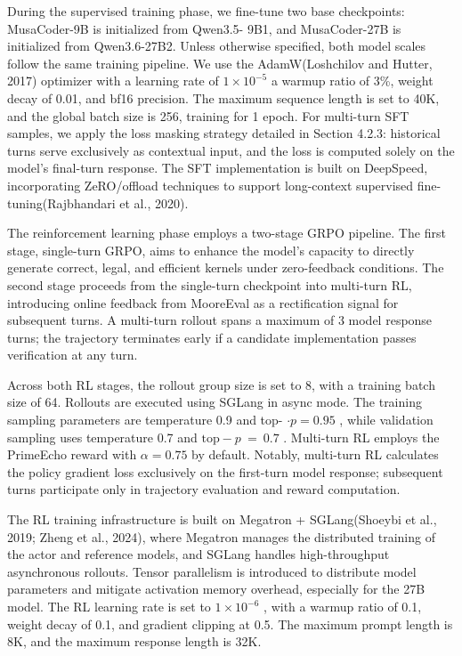 \documentclass[
  10
]{article}
\begin{document}
During the supervised training phase, we fine-tune two base checkpoints:
MusaCoder-9B is initialized from Qwen3.5- 9B1, and MusaCoder-27B is
initialized from Qwen3.6-27B2. Unless otherwise specified, both model
scales follow the same training pipeline. We use the AdamW(Loshchilov
and Hutter, 2017) optimizer with a learning rate of
\(1 \times 1 0 ^ { - 5 }\) a warmup ratio of 3\%, weight decay of 0.01,
and bf16 precision. The maximum sequence length is set to 40K, and the
global batch size is 256, training for 1 epoch. For multi-turn SFT
samples, we apply the loss masking strategy detailed in Section 4.2.3:
historical turns serve exclusively as contextual input, and the loss is
computed solely on the model's final-turn response. The SFT
implementation is built on DeepSpeed, incorporating ZeRO/offload
techniques to support long-context supervised fine-tuning(Rajbhandari et
al., 2020).

The reinforcement learning phase employs a two-stage GRPO pipeline. The
first stage, single-turn GRPO, aims to enhance the model's capacity to
directly generate correct, legal, and efficient kernels under
zero-feedback conditions. The second stage proceeds from the single-turn
checkpoint into multi-turn RL, introducing online feedback from
MooreEval as a rectification signal for subsequent turns. A multi-turn
rollout spans a maximum of 3 model response turns; the trajectory
terminates early if a candidate implementation passes verification at
any turn.

Across both RL stages, the rollout group size is set to 8, with a
training batch size of 64. Rollouts are executed using SGLang in async
mode. The training sampling parameters are temperature 0.9 and top-
\(\cdot p = 0 . 9 5\) , while validation sampling uses temperature 0.7
and \(\mathrm { t o p } { - } p ~ = ~ 0 . 7\) . Multi-turn RL employs
the PrimeEcho reward with \(\alpha = 0 . 7 5\) by default. Notably,
multi-turn RL calculates the policy gradient loss exclusively on the
first-turn model response; subsequent turns participate only in
trajectory evaluation and reward computation.

The RL training infrastructure is built on Megatron + SGLang(Shoeybi et
al., 2019; Zheng et al., 2024), where Megatron manages the distributed
training of the actor and reference models, and SGLang handles
high-throughput asynchronous rollouts. Tensor parallelism is introduced
to distribute model parameters and mitigate activation memory overhead,
especially for the 27B model. The RL learning rate is set to
\(1 \times 1 0 ^ { - 6 }\) , with a warmup ratio of 0.1, weight decay of
0.1, and gradient clipping at 0.5. The maximum prompt length is 8K, and
the maximum response length is 32K.
\end{document}
